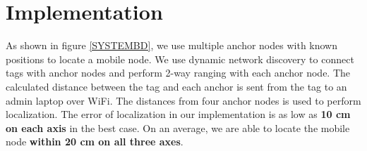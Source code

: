 \documentclass[journal,transmag]{IEEEtran}
\begin{document}

\section{Implementation}\label{sec:impl}
As shown in figure \ref{SYSTEMBD}, we use multiple anchor nodes with known positions to locate a mobile node. We use dynamic network discovery to connect tags with anchor nodes and perform 2-way ranging with each anchor node. The calculated distance between the tag and each anchor is sent from the tag to an admin laptop over WiFi. The distances from four anchor nodes is used to perform localization. The error of localization in our implementation is as low as \textbf{10 cm on each axis} in the best case. On an average, we are able to locate the mobile node \textbf{within 20 cm on all three axes}. 
\end{document}
